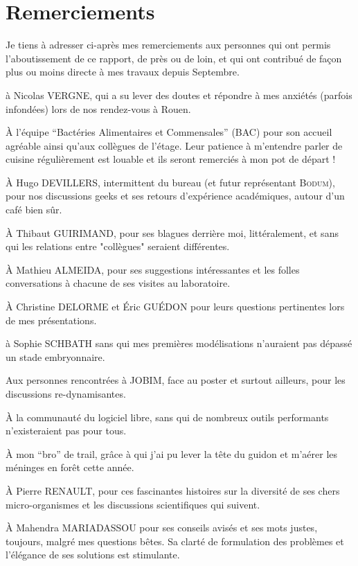 \section*{Remerciements}
\begin{footnotesize}

Je tiens à adresser ci-après mes remerciements aux personnes qui ont permis l'aboutissement de ce rapport, de près ou de loin, et qui ont contribué de façon plus ou moins directe à mes travaux depuis Septembre.

à Nicolas VERGNE, qui a su lever des doutes et répondre à mes anxiétés (parfois infondées) lors de nos rendez-vous à Rouen.

À l'équipe ``Bactéries Alimentaires et Commensales'' (BAC) pour son accueil agréable ainsi qu'aux collègues de l'étage.
Leur patience à m'entendre parler de cuisine régulièrement est louable et ils seront remerciés à mon pot de départ !

À Hugo DEVILLERS, intermittent du bureau (et futur représentant \textsc{Bodum}), pour nos discussions geeks et ses retours d'expérience académiques, autour d'un café bien sûr.

À Thibaut GUIRIMAND, pour ses blagues derrière moi, littéralement, et sans qui les relations entre "collègues" seraient différentes.

À Mathieu ALMEIDA, pour ses suggestions intéressantes et les folles conversations à chacune de ses visites au laboratoire. 

À Christine DELORME et Éric GUÉDON pour leurs questions pertinentes lors de mes présentations.

à Sophie SCHBATH sans qui mes premières modélisations n'auraient pas dépassé un stade embryonnaire.

Aux personnes rencontrées à JOBIM, face au poster et surtout ailleurs, pour les discussions re-dynamisantes.

À la communauté du logiciel libre, sans qui de nombreux outils performants n'existeraient pas pour tous.

À mon ``bro'' de trail, grâce à qui j'ai pu lever la tête du guidon et m'aérer les méninges en forêt cette année.

À Pierre RENAULT, pour ces fascinantes histoires sur la diversité de ses chers micro-organismes et les discussions scientifiques qui suivent.

À Mahendra MARIADASSOU pour ses conseils avisés et ses mots justes, toujours, malgré mes questions bêtes. Sa clarté de formulation des problèmes et l'élégance de ses solutions est stimulante.


\end{footnotesize}
